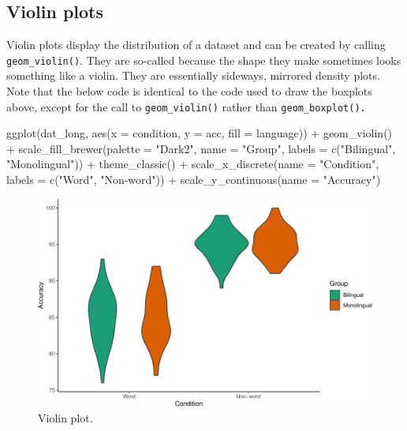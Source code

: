 \documentclass[
  english,
  doc,floatsintext]{apa6}
\newenvironment{Shaded}{\begin{snugshade}}{\end{snugshade}}
\newcommand{\AttributeTok}[1]{\textcolor[rgb]{0.77,0.63,0.00}{#1}}
\newcommand{\FunctionTok}[1]{\textcolor[rgb]{0.00,0.00,0.00}{#1}}
\newcommand{\NormalTok}[1]{#1}
\newcommand{\SpecialCharTok}[1]{\textcolor[rgb]{0.00,0.00,0.00}{#1}}
\newcommand{\StringTok}[1]{\textcolor[rgb]{0.31,0.60,0.02}{#1}}
\begin{document}
\hypertarget{violin-plots}{%
\subsection{Violin plots}\label{violin-plots}}

Violin plots display the distribution of a dataset and can be created by calling \texttt{geom\_violin()}. They are so-called because the shape they make sometimes looks something like a violin. They are essentially sideways, mirrored density plots. Note that the below code is identical to the code used to draw the boxplots above, except for the call to \texttt{geom\_violin()} rather than \texttt{geom\_boxplot().}

\begin{Shaded}
\begin{Highlighting}[]
\FunctionTok{ggplot}\NormalTok{(dat\_long, }\FunctionTok{aes}\NormalTok{(}\AttributeTok{x =}\NormalTok{ condition, }\AttributeTok{y =}\NormalTok{ acc, }\AttributeTok{fill =}\NormalTok{ language)) }\SpecialCharTok{+}
  \FunctionTok{geom\_violin}\NormalTok{() }\SpecialCharTok{+}
  \FunctionTok{scale\_fill\_brewer}\NormalTok{(}\AttributeTok{palette =} \StringTok{"Dark2"}\NormalTok{,}
                    \AttributeTok{name =} \StringTok{"Group"}\NormalTok{,}
                    \AttributeTok{labels =} \FunctionTok{c}\NormalTok{(}\StringTok{"Bilingual"}\NormalTok{, }\StringTok{"Monolingual"}\NormalTok{)) }\SpecialCharTok{+}
  \FunctionTok{theme\_classic}\NormalTok{() }\SpecialCharTok{+}
  \FunctionTok{scale\_x\_discrete}\NormalTok{(}\AttributeTok{name =} \StringTok{"Condition"}\NormalTok{,}
                   \AttributeTok{labels =} \FunctionTok{c}\NormalTok{(}\StringTok{"Word"}\NormalTok{, }\StringTok{"Non{-}word"}\NormalTok{)) }\SpecialCharTok{+}
  \FunctionTok{scale\_y\_continuous}\NormalTok{(}\AttributeTok{name =} \StringTok{"Accuracy"}\NormalTok{)}
\end{Highlighting}
\end{Shaded}

\begin{figure}

{\centering \includegraphics[width=1\linewidth]{images/violin1-1} 

}

\caption{Violin plot.}\label{fig:violin1}
\end{figure}
\end{document}
